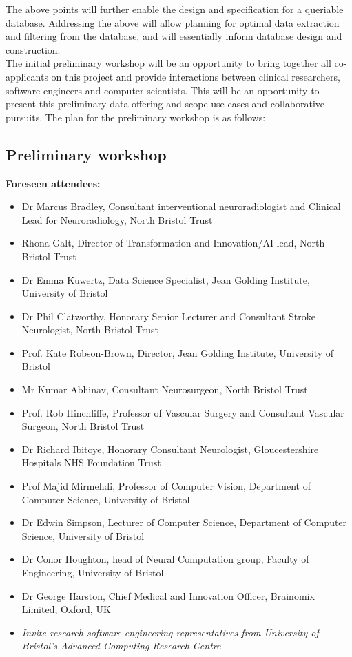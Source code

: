 \documentclass{article}
\begin{document}
The above points will further enable the design and specification for
a queriable database. Addressing the above will allow planning for
optimal data extraction and filtering from the database, and will
essentially inform database design and construction.\\

The initial preliminary workshop will be an opportunity to bring
together all co-applicants on this project and provide interactions
between clinical researchers, software engineers and computer
scientists. This will be an opportunity to present this preliminary
data offering and scope use cases and collaborative pursuits. The plan
for the preliminary workshop is as follows:\\

\subsection{Preliminary workshop}

\textbf{Foreseen attendees:}
\begin{itemize}
\item Dr Marcus Bradley, Consultant interventional neuroradiologist
  and Clinical Lead for Neuroradiology, North Bristol Trust
\item Rhona Galt, Director of Transformation and Innovation/AI lead,
  North Bristol Trust
\item Dr Emma Kuwertz, Data Science Specialist, Jean Golding
  Institute, University of Bristol
\item Dr Phil Clatworthy, Honorary Senior Lecturer and
  Consultant Stroke Neurologist, North Bristol Trust
\item Prof. Kate Robson-Brown, Director, Jean Golding
  Institute, University of Bristol
\item Mr Kumar Abhinav, Consultant Neurosurgeon, North Bristol Trust
\item Prof. Rob Hinchliffe, Professor of Vascular Surgery and
  Consultant Vascular Surgeon, North Bristol Trust
\item Dr Richard Ibitoye, Honorary Consultant Neurologist,
  Gloucestershire Hospitals NHS Foundation Trust
\item Prof Majid Mirmehdi, Professor of Computer Vision, Department of
  Computer Science, University of Bristol
\item Dr Edwin Simpson, Lecturer of Computer Science, Department of
  Computer Science, University of Bristol
\item Dr Conor Houghton, head of Neural Computation group, Faculty
  of Engineering, University of Bristol
\item Dr George Harston, Chief Medical and Innovation Officer,
  Brainomix Limited, Oxford, UK
\item \textit{Invite research software engineering representatives from
    University of Bristol's Advanced Computing Research Centre}
\end{itemize}
\end{document}

